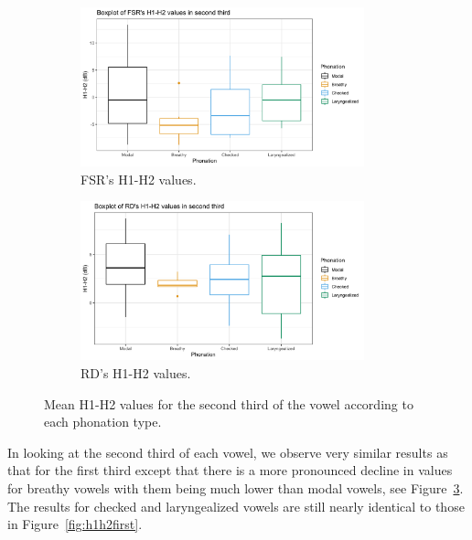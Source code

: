 \documentclass[12pt, letterpaper]{article}
\begin{document}
\begin{figure}[!ht]
	\centering
	\begin{subfigure}{.5\textwidth}
		\centering
		\includegraphics[width=0.9\textwidth]{Images/mean_FSR_h1h2_2nd.png}
		\caption{FSR's H1-H2 values.}
		\label{fig:FSRh1h2second} 
	\end{subfigure}%
	\begin{subfigure}{.5\textwidth}
		\centering
		\includegraphics[width=0.9\textwidth]{Images/mean_RD_h1h2_2nd.png}
		\caption{RD's H1-H2 values.}
		\label{fig:RDh1h2second} 
	\end{subfigure}
	\caption{Mean H1-H2 values for the second third of the vowel according to each phonation type.}
	\label{fig:h1h2second}
\end{figure}

In looking at the second third of each vowel, we observe very similar results as that for the first third except that there is a more pronounced decline in values for breathy vowels with them being much lower than modal vowels, see Figure~\ref{fig:h1h2second}. The results for checked and laryngealized vowels are still nearly identical to those in Figure~\ref{fig:h1h2first}.
\end{document}
